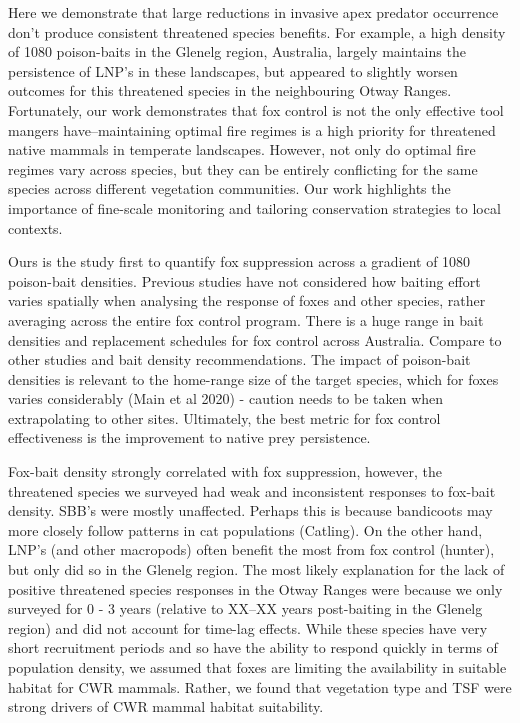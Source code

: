 \documentclass[11pt,a4paper,titlepage,twoside,openright]{style/unimelbthesis}
\begin{document}
\begin{mainmatter}
Here we demonstrate that large reductions in invasive apex predator occurrence don't produce consistent threatened species benefits. For example, a high density of 1080 poison-baits in the Glenelg region, Australia, largely maintains the persistence of LNP's in these landscapes, but appeared to slightly worsen outcomes for this threatened species in the neighbouring Otway Ranges. Fortunately, our work demonstrates that fox control is not the only effective tool mangers have--maintaining optimal fire regimes is a high priority for threatened native mammals in temperate landscapes. However, not only do optimal fire regimes vary across species, but they can be entirely conflicting for the same species across different vegetation communities. Our work highlights the importance of fine-scale monitoring and tailoring conservation strategies to local contexts.

Ours is the study first to quantify fox suppression across a gradient of 1080 poison-bait densities. Previous studies have not considered how baiting effort varies spatially when analysing the response of foxes and other species, rather averaging across the entire fox control program. There is a huge range in bait densities and replacement schedules for fox control across Australia. Compare to other studies and bait density recommendations.
The impact of poison-bait densities is relevant to the home-range size of the target species, which for foxes varies considerably (Main et al 2020) - caution needs to be taken when extrapolating to other sites. Ultimately, the best metric for fox control effectiveness is the improvement to native prey persistence.

Fox-bait density strongly correlated with fox suppression, however, the threatened species we surveyed had weak and inconsistent responses to fox-bait density. SBB's were mostly unaffected. Perhaps this is because bandicoots may more closely follow patterns in cat populations (Catling). On the other hand, LNP's (and other macropods) often benefit the most from fox control (hunter), but only did so in the Glenelg region. The most likely explanation for the lack of positive threatened species responses in the Otway Ranges were because we only surveyed for 0 - 3 years (relative to XX--XX years post-baiting in the Glenelg region) and did not account for time-lag effects. While these species have very short recruitment periods and so have the ability to respond quickly in terms of population density, we assumed that foxes are limiting the availability in suitable habitat for CWR mammals. Rather, we found that vegetation type and TSF were strong drivers of CWR mammal habitat suitability.


\end{mainmatter}
\end{document}
